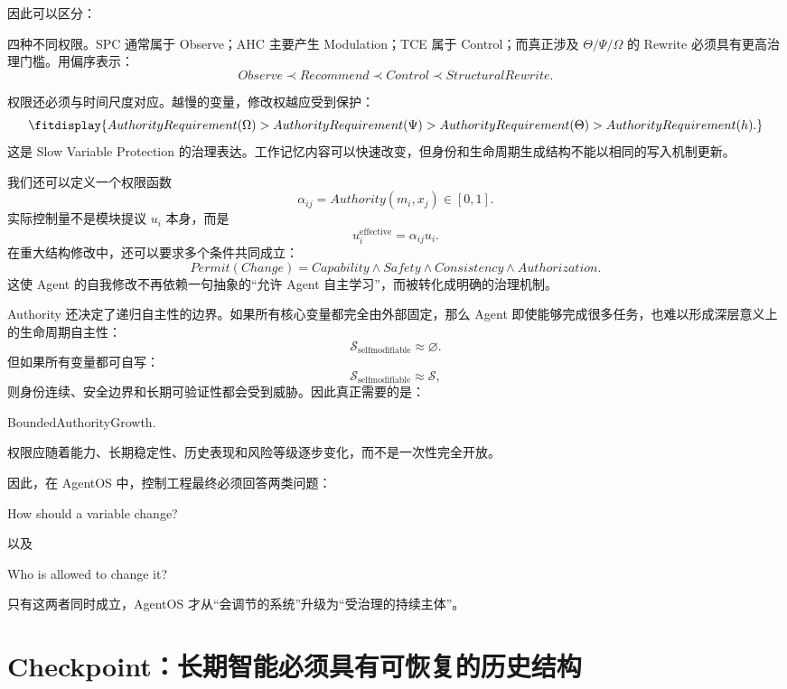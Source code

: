因此可以区分：
\begin{statementbox}
\centering
{}
\end{statementbox}
四种不同权限。SPC 通常属于 Observe；AHC 主要产生 Modulation；TCE 属于 Control；而真正涉及 $\Theta/\Psi/\Omega$ 的 Rewrite 必须具有更高治理门槛。用偏序表示：
\[
Observe
\prec
Recommend
\prec
Control
\prec
StructuralRewrite.
\]

权限还必须与时间尺度对应。越慢的变量，修改权越应受到保护：
\[
\fitdisplay{
AuthorityRequirement(\Omega)
>
AuthorityRequirement(\Psi)
>
AuthorityRequirement(\Theta)
>
AuthorityRequirement(h).
}
\]
这是 Slow Variable Protection 的治理表达。工作记忆内容可以快速改变，但身份和生命周期生成结构不能以相同的写入机制更新。

我们还可以定义一个权限函数
\[
\alpha_{ij}
=
Authority(m_i,x_j)\in[0,1].
\]
实际控制量不是模块提议 $u_i$ 本身，而是
\[
u_i^{\mathrm{effective}}
=
\alpha_{ij}
u_i.
\]
在重大结构修改中，还可以要求多个条件共同成立：
\[
Permit(Change)
=
Capability
\land
Safety
\land
Consistency
\land
Authorization.
\]
这使 Agent 的自我修改不再依赖一句抽象的``允许 Agent 自主学习''，而被转化成明确的治理机制。

Authority 还决定了递归自主性的边界。如果所有核心变量都完全由外部固定，那么 Agent 即使能够完成很多任务，也难以形成深层意义上的生命周期自主性：
\[
\mathcal S_{\mathrm{selfmodifiable}}
\approx\varnothing.
\]
但如果所有变量都可自写：
\[
\mathcal S_{\mathrm{selfmodifiable}}
\approx\mathcal S,
\]
则身份连续、安全边界和长期可验证性都会受到威胁。因此真正需要的是：
\begin{statementbox}
BoundedAuthorityGrowth.
\end{statementbox}
权限应随着能力、长期稳定性、历史表现和风险等级逐步变化，而不是一次性完全开放。

因此，在 AgentOS 中，控制工程最终必须回答两类问题：
\begin{statementbox}
How should a variable change?
\end{statementbox}
以及
\begin{statementbox}
Who is allowed to change it?
\end{statementbox}
只有这两者同时成立，AgentOS 才从``会调节的系统''升级为``受治理的持续主体''。

\section{Checkpoint：长期智能必须具有可恢复的历史结构}

